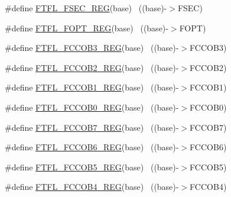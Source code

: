\begin{DoxyCompactItemize}
\item 
\#define \hyperlink{group___f_t_f_l___register___accessor___macros_ga24c533d0a36f2a369d16c5801fa99c90}{F\+T\+F\+L\+\_\+\+F\+S\+E\+C\+\_\+\+R\+EG}(base)                                        ~((base)-\/$>$F\+S\+EC)
\item 
\#define \hyperlink{group___f_t_f_l___register___accessor___macros_gaa19b55e321560f11e71f7cba374dbe7e}{F\+T\+F\+L\+\_\+\+F\+O\+P\+T\+\_\+\+R\+EG}(base)                                        ~((base)-\/$>$F\+O\+PT)
\item 
\#define \hyperlink{group___f_t_f_l___register___accessor___macros_gafb6ad80128940470498489c7ca3c1f6b}{F\+T\+F\+L\+\_\+\+F\+C\+C\+O\+B3\+\_\+\+R\+EG}(base)                                    ~((base)-\/$>$F\+C\+C\+O\+B3)
\item 
\#define \hyperlink{group___f_t_f_l___register___accessor___macros_ga12697c398db5990129d2f65ced25b3cc}{F\+T\+F\+L\+\_\+\+F\+C\+C\+O\+B2\+\_\+\+R\+EG}(base)                                    ~((base)-\/$>$F\+C\+C\+O\+B2)
\item 
\#define \hyperlink{group___f_t_f_l___register___accessor___macros_gab99efa5cba6e3a97a61634ff367e38d2}{F\+T\+F\+L\+\_\+\+F\+C\+C\+O\+B1\+\_\+\+R\+EG}(base)                                    ~((base)-\/$>$F\+C\+C\+O\+B1)
\item 
\#define \hyperlink{group___f_t_f_l___register___accessor___macros_ga6e99a315254057699b17fca8421e31f8}{F\+T\+F\+L\+\_\+\+F\+C\+C\+O\+B0\+\_\+\+R\+EG}(base)                                    ~((base)-\/$>$F\+C\+C\+O\+B0)
\item 
\#define \hyperlink{group___f_t_f_l___register___accessor___macros_ga4dc682960fb3bdce9c012b91a56e8ec1}{F\+T\+F\+L\+\_\+\+F\+C\+C\+O\+B7\+\_\+\+R\+EG}(base)                                    ~((base)-\/$>$F\+C\+C\+O\+B7)
\item 
\#define \hyperlink{group___f_t_f_l___register___accessor___macros_ga0187db09b3ffc38e4c0202b3e1764b3f}{F\+T\+F\+L\+\_\+\+F\+C\+C\+O\+B6\+\_\+\+R\+EG}(base)                                    ~((base)-\/$>$F\+C\+C\+O\+B6)
\item 
\#define \hyperlink{group___f_t_f_l___register___accessor___macros_ga32f6aba32c376459e9d4245c477a2027}{F\+T\+F\+L\+\_\+\+F\+C\+C\+O\+B5\+\_\+\+R\+EG}(base)                                    ~((base)-\/$>$F\+C\+C\+O\+B5)
\item 
\#define \hyperlink{group___f_t_f_l___register___accessor___macros_gae0954f895054d630b956bf9c6655d98a}{F\+T\+F\+L\+\_\+\+F\+C\+C\+O\+B4\+\_\+\+R\+EG}(base)                                    ~((base)-\/$>$F\+C\+C\+O\+B4)

\end{DoxyCompactItemize}

